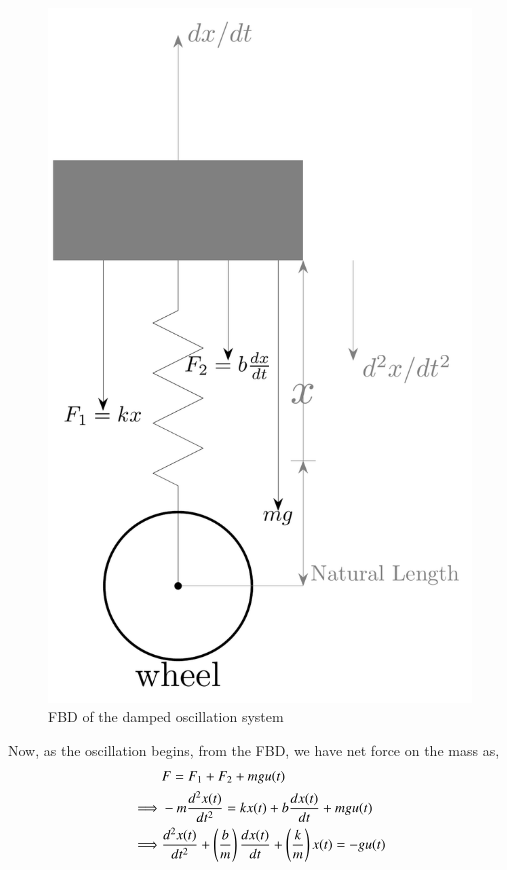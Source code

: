 \documentclass[journal,12pt,twocolumn]{IEEEtran}
\theoremstyle{remark}
\begin{document}
    \begin{figure}[h]
        \centering
        \includegraphics[width=0.5\columnwidth]{ncert-physics/11/14/21/figs/11_14_21_fbd.pdf}
        \caption{FBD of the damped oscillation system}
    \end{figure}

    Now, as the oscillation begins, from the FBD, we have net force on the mass as,
    \begin{align}
        &F=F_{1}+F_{2}+mgu(t) \\
        \implies &-m\frac{d^2x(t)}{dt^2}=kx(t)+b\frac{dx(t)}{dt}+mgu(t) \\
        \implies &\frac{d^2x(t)}{dt^2}+\left(\frac{b}{m}\right)\frac{dx(t)}{dt}+\left(\frac{k}{m}\right)x(t)=-gu(t)
    \end{align}
\end{document}
